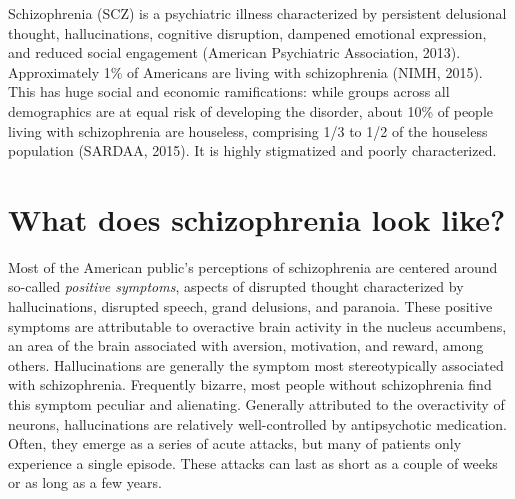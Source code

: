 \documentclass[12pt,twoside]{reedthesis}
\begin{document}
	Schizophrenia (SCZ) is a psychiatric illness characterized by persistent delusional thought, hallucinations, cognitive disruption, dampened emotional expression, and reduced social engagement (American Psychiatric Association, 2013). Approximately 1\% of Americans are living with schizophrenia (NIMH, 2015). This has huge social and economic ramifications: while groups across all demographics are at equal risk of developing the disorder, about 10\% of people living with schizophrenia are houseless, comprising 1/3 to 1/2 of the houseless population (SARDAA, 2015). It is highly stigmatized and poorly characterized.
	
	\section{What does schizophrenia look like?}
	Most of the American public's perceptions of schizophrenia are centered around so-called \textit{positive symptoms}, aspects of disrupted thought characterized by hallucinations, disrupted speech, grand delusions, and paranoia. These positive symptoms are attributable to overactive brain activity in the nucleus accumbens, an area of the brain associated with aversion, motivation, and reward, among others. Hallucinations are generally the symptom most stereotypically associated with schizophrenia. Frequently bizarre, most people without schizophrenia find this symptom peculiar and alienating. Generally attributed to the overactivity of neurons, hallucinations are relatively well-controlled by antipsychotic medication. Often, they emerge as a series of acute attacks, but many of patients only experience a single episode. These attacks can last as short as a couple of weeks or as long as a few years. 
	
\end{document}
